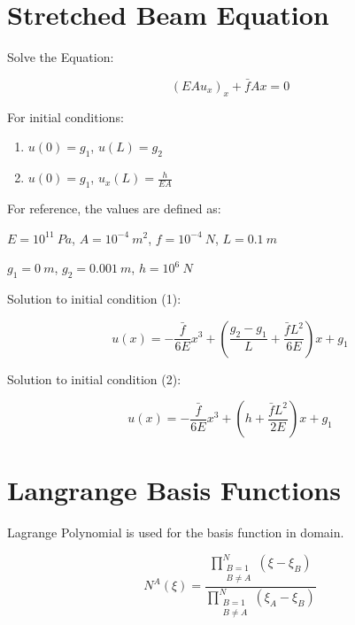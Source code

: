 \documentclass[letterpaper]{report}
\begin{document}
\chapter{Stretched Beam Equation}

Solve the Equation:

\begin{equation}
\left(EA u_x \right)_x + \bar{f}Ax = 0
\end{equation}

For initial conditions:

\begin{enumerate}
\item $u(0) = g_1$, $u(L) = g_2$
\item $u(0) = g_1$, $u_x(L) = \frac{h}{EA}$
\end{enumerate}

For reference, the values are defined as:

\vspace{0.3in}
$E = 10^{11}~Pa$, $A = 10^{-4}~m^2$, $f = 10^{-4}~N$, $L = 0.1~m$

$g_1 = 0~m$, $g_2 = 0.001~m$, $h = 10^6~N$

\vspace{0.3in}
Solution to initial condition (1):

\begin{equation}
u(x) = -\frac{\bar{f}}{6E} x^3 + \left( \frac{g_2-g_1}{L} + \frac{\bar{f}L^2}{6E} \right) x + g_1
\end{equation}

Solution to initial condition (2):

\begin{equation}
u(x) = -\frac{\bar{f}}{6E} x^3 + \left( h+\frac{\bar{f}L^2}{2E} \right) x + g_1
\end{equation}

\chapter{Langrange Basis Functions}

Lagrange Polynomial is used for the basis function in domain.

\begin{equation}
N^A(\xi) = \frac{\prod\limits_{\substack{B=1 \\ B\ne A}}^{N} (\xi-\xi_B)}{\prod\limits_{\substack{B=1 \\ B \ne A}}^{N} (\xi_A-\xi_B)}
\end{equation}
\end{document}
